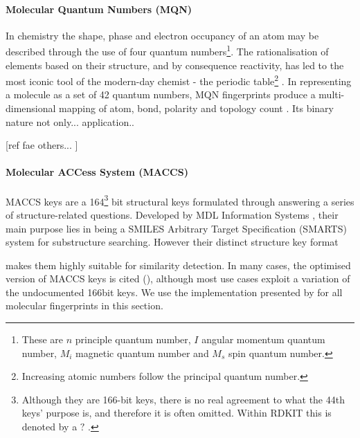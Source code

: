 \paragraph{Molecular Quantum Numbers (MQN)}
In chemistry the shape, phase and electron occupancy of an atom may be described through the use of four quantum numbers\footnote{These are $n$ principle quantum number, $I$ angular momentum quantum number, $M_i$ magnetic quantum number and $M_s$ spin quantum number.}. The rationalisation of elements based on their structure, and by consequence reactivity, has led to the most iconic tool of the modern-day chemist - the periodic table\footnote{Increasing atomic numbers follow the principal quantum number.} \citep{periodic}. In representing a molecule as a set of 42 quantum numbers, MQN fingerprints produce a multi-dimensional mapping of atom, bond, polarity and topology count \citep{MQN}. Its binary nature not only... application..

[ref fae others... ]

\paragraph{Molecular ACCess System (MACCS)}
MACCS keys are a 164\footnote{Although they are 166-bit keys, there is no real agreement to what the 44th keys' purpose is, and therefore it is often omitted. Within RDKIT this is denoted by a $?$ \citep{rdkitcode}.} bit structural keys formulated through answering a series of structure-related questions. Developed by MDL Information Systems \citep{maccs}, their main purpose lies in being a SMILES Arbitrary Target Specification (SMARTS) system for substructure searching. However their distinct structure key format

makes them highly suitable for similarity detection. In many cases, the optimised version of MACCS keys is cited (\citep{optimised}), although most use cases exploit a variation of the undocumented 166bit keys. We use the implementation presented by \citep{rdkit,rdkitcode} for all molecular fingerprints in this section.
